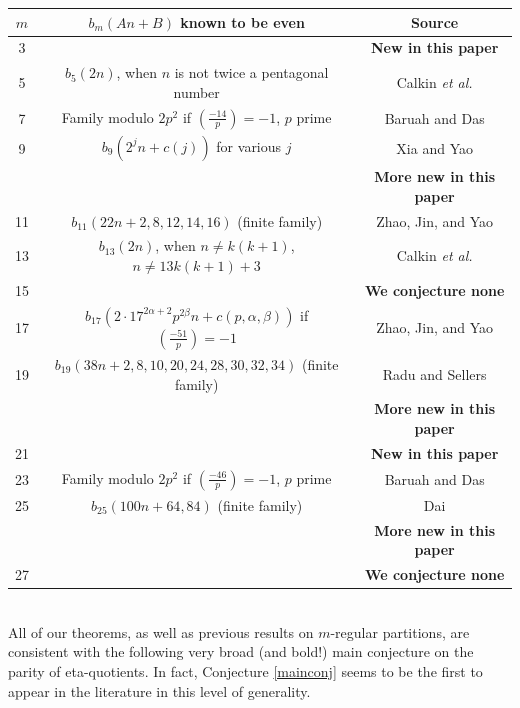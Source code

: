\documentclass[12pt]{amsart}
\theoremstyle{definition}
\begin{document}
\begin{center}
\begin{tabular}{|c|c|c|}
\hline $m$ & $b_m(An+B)$ known to be even &  Source \\
\hline 3 & & \textbf{New in this paper} \\
\hline 5 & $b_5(2n)$, when $n$ is not twice a pentagonal number & Calkin \emph{et al.} \cite{Calkinetal} \\
\hline 7 & Family modulo $2p^2$ if $(\frac{-14}{p}) = -1$, $p$ prime  & Baruah and Das \cite{BD} \\
\hline 9 & $b_9(2^jn+ c(j))$ for various $j$  & Xia and Yao \cite{xiayao9} \\
 & & \textbf{More new in this paper} \\
\hline 11 & $b_{11}(22n+2,8,12,14,16)$ (finite family) &  Zhao, Jin, and Yao \cite{ZJY} \\
\hline 13 & $b_{13}(2n)$, when $n \neq k(k+1)$, $n \neq 13k(k+1)+3$  & Calkin \emph{et al.} \cite{Calkinetal} \\
\hline 15 & & \textbf{We conjecture none} \\
\hline 17 & $b_{17}(2 \cdot 17^{2\alpha+2}p^{2\beta}n+ c(p,\alpha,\beta))$ if $(\frac{-51}{p})=-1$ & Zhao, Jin, and Yao \cite{ZJY} \\
\hline 19 & $b_{19}(38n+2,8,10,20,24,28,30,32,34)$ (finite family) & Radu and Sellers \cite{RaduSellers} \\
 & & \textbf{More new in this paper} \\
\hline 21 & & \textbf{New in this paper} \\
\hline 23 & Family modulo $2p^2$ if $(\frac{-46}{p}) = -1$, $p$ prime & Baruah and Das \cite{BD} \\
\hline 25 & $b_{25}(100n+64,84)$ (finite family) & Dai \cite{Dai} \\
 & & \textbf{More new in this paper} \\
\hline 27 & & \textbf{We conjecture none} \\
\hline 
\end{tabular}
\end{center}
{\ }\\
\indent All of our theorems, as well as previous results on $m$-regular partitions, are consistent with the following very broad (and bold!) main conjecture on the parity of eta-quotients.  In fact, Conjecture \ref{mainconj} seems to be the first to appear in the literature in this level of generality.%
\end{document}
